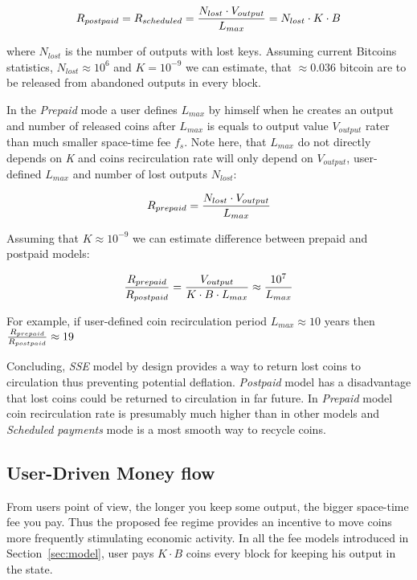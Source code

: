 \documentclass[]{llncs}   %
\newcommand{\esse}{\textit{SSE}}
\begin{document}
\begin{equation}
R_{postpaid} = R_{scheduled} = {N_{lost} \cdot V_{output} \over L_{max}} = {N_{lost} \cdot K \cdot B}
\end{equation}

where $N_{lost}$ is the number of outputs with lost keys. Assuming current Bitcoins statistics, $N_{lost}\approx10^6$ and $K = 10^{-9}$ we can estimate, that $\approx0.036$ bitcoin are to be released from abandoned outputs in every block.

In the \textit{Prepaid} mode a user defines $L_{max}$ by himself when he creates an output and number of released coins after $L_{max}$ is equals to output value $V_{output}$ rater than much smaller space-time fee $f_s$. Note here, that $L_{max}$ do not directly depends on \textit{K} and coins recirculation rate will only depend on $V_{output}$, user-defined $L_{max}$ and number of lost outputs $N_{lost}$:

\begin{equation}
R_{prepaid} = {N_{lost} \cdot V_{output} \over L_{max}}
\end{equation}

Assuming that $K\approx10^{-9}$ we can estimate difference between prepaid and postpaid models:

\begin{equation}
{R_{prepaid} \over R_{postpaid}} = {V_{output} \over  K \cdot B \cdot L_{max}} \approx {10^7 \over L_{max}}
\end{equation}

For example, if user-defined coin recirculation period $L_{max}\approx10$ years then ${R_{prepaid} \over R_{postpaid}} \approx 19$

Concluding, \esse{} model by design provides a way to return lost coins to circulation thus preventing potential deflation. \textit{Postpaid} model has a disadvantage  that lost coins could be returned to circulation in far future. In \textit{Prepaid} model coin recirculation rate is presumably much higher than in other models and \textit{Scheduled payments} mode is a most smooth way to recycle coins.



\subsection{User-Driven Money flow}
\label{sec:flow}

From users point of view, the longer you keep some output, the bigger space-time fee you pay. Thus the proposed fee regime provides an incentive to move coins more frequently stimulating economic activity. In all the fee models introduced in Section~\ref{sec:model}, user pays ${K \cdot B}$ coins every block for keeping his output in the state. 
\end{document}
